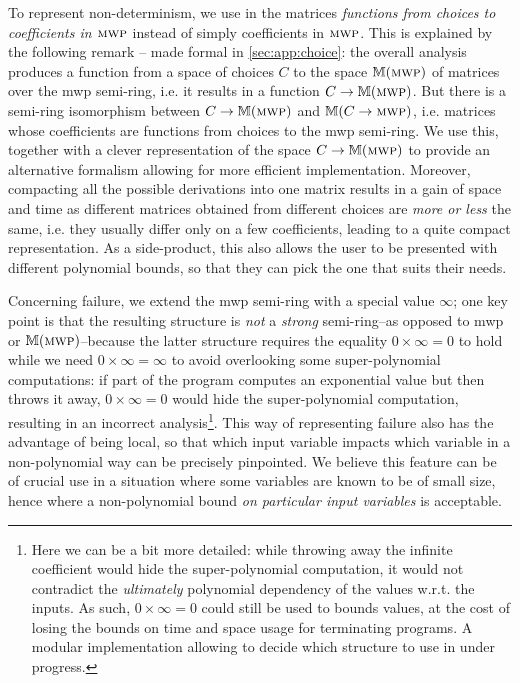 \documentclass[runningheads]{llncs}
\makeatletter
\newcommand*{\ie}{i.e.\@\xspace}
\makeatother
\begin{document}
To represent non-determinism, we use in the matrices \emph{functions from choices to coefficients in \(\textsc{mwp}\)} instead of simply coefficients in \(\textsc{mwp}\).
This is explained by the following remark -- made formal in \autoref{sec:app:choice}: the overall analysis produces a function from a space of choices \(C\) to the space \(\mathbb{M}(\textsc{mwp})\) of matrices over the mwp semi-ring, \ie it results in a function \(C\rightarrow \mathbb{M}(\textsc{mwp})\). But there is a semi-ring isomorphism between \(C\rightarrow \mathbb{M}(\textsc{mwp})\) and \(\mathbb{M}(C\rightarrow \textsc{mwp})\), \ie matrices whose coefficients are functions from choices to the mwp semi-ring. We use this, together with a clever representation of the space \(C\rightarrow \mathbb{M}(\textsc{mwp})\) to provide an alternative formalism allowing for more efficient implementation. Moreover, compacting all the possible derivations into one matrix results in a gain of space and time as different matrices obtained from different choices are \emph{more or less} the same, \ie they usually differ only on a few coefficients, leading to a quite compact representation. As a side-product, this also allows the user to be presented with different polynomial bounds, so that they can pick the one that suits their needs. %

Concerning failure, we extend the mwp semi-ring with a special value \(\infty\); one key point is that the resulting structure is \emph{not} a \emph{strong} semi-ring--as opposed to mwp or \(\mathbb{M}(\textsc{mwp})\)--because the latter structure requires the equality \(0\times \infty=0\) to hold while we need \(0\times \infty=\infty\) to avoid overlooking some super-polynomial computations: if part of the program computes an exponential value but then throws it away, \(0\times \infty=0\) would hide the super-polynomial computation, resulting in an incorrect analysis\footnote{Here we can be a bit more detailed: while throwing away the infinite coefficient would hide the super-polynomial computation, it would not contradict the \emph{ultimately} polynomial dependency of the values w.r.t. the inputs. As such, \(0\times \infty=0\) could still be used to bounds values, at the cost of losing the bounds on time and space usage for terminating programs. A modular implementation allowing to decide which structure to use in under progress.}. This way of representing failure also has the advantage of being local, so that which input variable impacts which variable in a non-polynomial way can be precisely pinpointed.
We believe this feature can be of crucial use in a situation where some variables are known to be of small size, hence where a non-polynomial bound \emph{on particular input variables} is acceptable.
\end{document}
